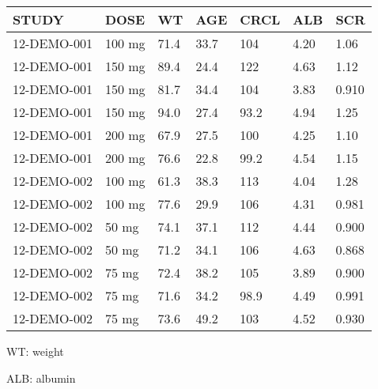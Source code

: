 {\def\arraystretch{1.4}\tabcolsep=5pt
\begin{threeparttable}
\begin{tabular}[h]{lllllll}
\hline
STUDY & DOSE & WT & AGE & CRCL & ALB & SCR \\
\hline
12-DEMO-001 & 100 mg & 71.4 & 33.7 & 104 & 4.20 & 1.06 \\
12-DEMO-001 & 150 mg & 89.4 & 24.4 & 122 & 4.63 & 1.12 \\
12-DEMO-001 & 150 mg & 81.7 & 34.4 & 104 & 3.83 & 0.910 \\
12-DEMO-001 & 150 mg & 94.0 & 27.4 & 93.2 & 4.94 & 1.25 \\
12-DEMO-001 & 200 mg & 67.9 & 27.5 & 100 & 4.25 & 1.10 \\
12-DEMO-001 & 200 mg & 76.6 & 22.8 & 99.2 & 4.54 & 1.15 \\
12-DEMO-002 & 100 mg & 61.3 & 38.3 & 113 & 4.04 & 1.28 \\
12-DEMO-002 & 100 mg & 77.6 & 29.9 & 106 & 4.31 & 0.981 \\
12-DEMO-002 & 50 mg & 74.1 & 37.1 & 112 & 4.44 & 0.900 \\
12-DEMO-002 & 50 mg & 71.2 & 34.1 & 106 & 4.63 & 0.868 \\
12-DEMO-002 & 75 mg & 72.4 & 38.2 & 105 & 3.89 & 0.900 \\
12-DEMO-002 & 75 mg & 71.6 & 34.2 & 98.9 & 4.49 & 0.991 \\
12-DEMO-002 & 75 mg & 73.6 & 49.2 & 103 & 4.52 & 0.930 \\
\hline
\end{tabular}
\begin{tablenotes}[flushleft]
\item WT: weight
\item ALB: albumin
\end{tablenotes}
\end{threeparttable}
}
